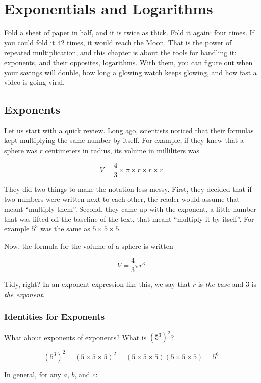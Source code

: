 \chapter{Exponentials and Logarithms}


Fold a sheet of paper in half, and it is twice as thick. Fold it again:
four times. If you could fold it 42 times, it would reach the Moon. That
is the power of repeated multiplication, and this chapter is about the
tools for handling it: exponents, and their opposites, logarithms. With
them, you can figure out when your savings will double, how long a glowing
watch keeps glowing, and how fast a video is going viral.

\section{Exponents}

Let us start with a quick review. Long ago, scientists noticed that their
formulas kept multiplying the same number by itself. For example, if they knew that a sphere was $r$
centimeters in radius, its volume in milliliters was

$$V = \frac{4}{3} \times \pi \times r \times r \times r$$

They did two things to make the notation less messy. First, they
decided that if two numbers were written next to each other, the
reader would assume that meant ``multiply them''. Second, they came
up with the exponent, a little number that was lifted off the
baseline of the text, that meant ``multiply it by itself''. For
example $5^3$ was the same as $5 \times 5 \times 5$.

Now, the formula for the volume of a sphere is written

$$V = \frac{4}{3} \pi r^3$$

Tidy, right? In an exponent expression like this, we say that $r$ is
\textit{the base} and $3$ is \textit{the exponent}.

\subsection{Identities for Exponents}

What about exponents of exponents?  What is $\left(5^3\right)^2$?

$$\left(5^3\right)^2 = (5 \times 5 \times 5)^2 = (5 \times 5 \times 5)(5 \times 5 \times 5) = 5^6$$

In general, for any $a$, $b$, and $c$:

